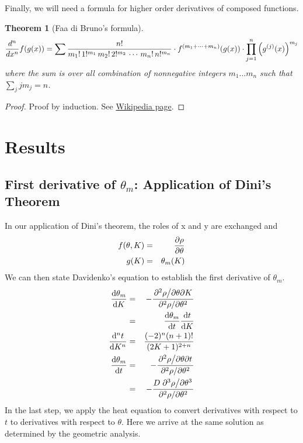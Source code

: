 \documentclass[11pt]{article} %
\newtheorem{theorem}{Theorem}
\begin{document}
Finally, we will need a formula for higher order derivatives of composed functions.
\begin{theorem}[Faa di Bruno's formula]
\begin{equation}
{d^n \over dx^n} f(g(x))=\sum \frac{n!}{m_1!\,1!^{m_1}\,m_2!\,2!^{m_2}\,\cdots\,m_n!\,n!^{m_n}}\cdot f^{(m_1+\cdots+m_n)}(g(x))\cdot \prod_{j=1}^n\left(g^{(j)}(x)\right)^{m_j}
\end{equation}
where the sum is over all combination of nonnegative integers $ m_1 \hdots m_n $ \newline
 such that $ \sum_j j m_j = n $.
\end{theorem}
\begin{proof}
Proof by induction. See \href{https://en.wikipedia.org/wiki/Fa\%C3\%A0\_di\_Bruno\%27s\_formula}{Wikipedia page}. 
\end{proof}

\section{Results}

\subsection{First derivative of $\theta_m$: Application of Dini's Theorem}

In our application of Dini's theorem, the roles of x and y are exchanged and
\begin{eqnarray}
f(\theta,K) & = &  \pdv{\rho}{\theta} \\
g(K) & = & \theta_m(K)
\end{eqnarray}
We can then state Davidenko's equation to establish the first derivative of $ \theta_m $.
\begin{eqnarray}
\dv{\theta_m}{K} & = & -\frac{ \pdv*{\rho}{\theta}{K} }{ \pdv*[2]{\rho}{\theta} } \\
                         & = & \dv{\theta_m}{t} \dv{t}{K} \\
\dv[n]{t}{K}  & = & \frac{(-2)^n (n+1)!}{(2K+1)^{2+n}} \\
\dv{\theta_m}{t}  & = & -\frac{ \pdv*{\rho}{\theta}{t} }{ \pdv*[2]{\rho}{\theta} }  \\
                         & = & -\frac{ D \pdv*[3]{\rho}{\theta} }{ \pdv*[2]{\rho}{\theta} } 
\end{eqnarray}
In the last step, we apply the heat equation to convert derivatives with respect to $ t $ to derivatives with respect to $ \theta $. Here we arrive at the same solution as determined by the geometric analysis.
\end{document}
